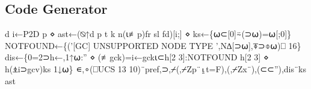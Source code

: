 \documentclass{article}%
\begin{document}
\subsection{Code Generator}

\nwenddocs{}\endmoddef\nwstartdeflinemarkup{}\nwenddeflinemarkup
d i←P2D p ⋄ ast←(⍉↑d p t k n(⍳≢p)fr sl fd)[i;] ⋄ ks←\{⍵⊂[0]⍨(⊃⍵)=⍵[;0]\}
NOTFOUND←\{('[GC] UNSUPPORTED NODE TYPE ',N∆[⊃⍵],⍕⊃⌽⍵)⎕ 16\}
dis←\{0=2⊃h←,1↑⍵:'' ⋄ (≢gck)=i←gck⍳⊂h[2 3]:NOTFOUND h[2 3] ⋄ h(⍎i⊃gcv)ks 1↓⍵\}
∊,∘(⎕UCS 13 10)¨pref,⊃,⌿(,⌿Zp¨⍸t=F),(,⌿Zx¨),(⊂⊂''),dis¨ks ast
\nwendcode{}\nwdocspar
\end{document}
